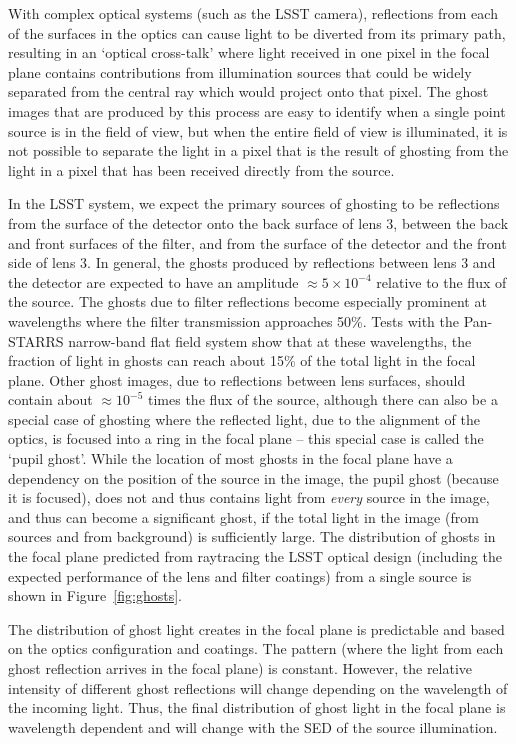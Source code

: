 \documentclass[12pt,preprint]{aastex}
\begin{document}
With complex optical systems (such as the LSST camera), reflections
from each of the surfaces in the optics can cause light to be diverted
from its primary path, resulting in an `optical cross-talk' where
light received in one pixel in the focal plane contains contributions
from illumination sources that could be widely separated from the
central ray which would project onto that pixel.  The ghost images
that are produced by this process are easy to identify when a single
point source is in the field of view, but when the entire field of
view is illuminated, it is not possible to separate the light in a
pixel that is the result of ghosting from the light in a pixel that
has been received directly from the source. 

In the LSST system, we expect the primary sources of ghosting to be
reflections from the surface of the detector onto the back surface of
lens 3, between the back and front surfaces of the filter, and from
the surface of the detector and the front side of lens 3. In general,
the ghosts produced by reflections between lens 3 and the detector are
expected to have an amplitude $\approx 5\times 10^{-4}$ relative to the
flux of the source.  The ghosts due to filter reflections become
especially prominent at wavelengths where the filter transmission
approaches 50\%.  Tests with the Pan-STARRS narrow-band flat field
system \citep{Stubbs2010a} show that at these wavelengths, the
fraction of light in ghosts can reach about 15\% of the total light in
the focal plane.  Other ghost images, due to reflections between lens
surfaces, should contain about $\approx10^{-5}$ times the flux of the
source, although there can also be a special case of ghosting where
the reflected light, due to the alignment of the optics, is focused
into a ring in the focal plane -- this special case is called the
`pupil ghost'.  While the location of most ghosts in the focal plane
have a dependency on the position of the source in the image, the
pupil ghost (because it is focused), does not and thus contains light
from {\it every} source in the image, and thus can become a
significant ghost, if the total light in the image (from sources and
from background) is sufficiently
large. The distribution of ghosts in the focal plane predicted from
raytracing the LSST optical design (including the expected performance
of the lens and filter coatings) from a single
source is shown in Figure~\ref{fig:ghosts}.

The distribution of ghost light creates in the focal plane is
predictable and based on the optics configuration and coatings. The
pattern (where the light from each ghost reflection arrives in the
focal plane) is constant. However, the relative intensity of different
ghost reflections will change depending on the wavelength of the
incoming light. Thus, the final distribution of ghost light in the
focal plane is wavelength dependent and will change with the SED of
the source illumination.
\end{document}
